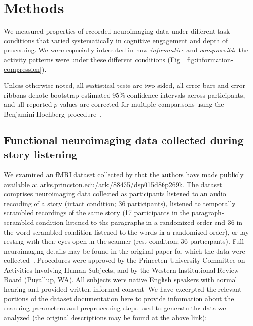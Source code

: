 \documentclass[english, 11pt]{article}
\begin{document}
\section*{Methods}

We measured properties of recorded neuroimaging data under different task
conditions that varied systematically in cognitive engagement and depth of
processing. We were especially interested in how \textit{informative} and
\textit{compressible} the activity patterns were under these different
conditions (Fig.~\ref{fig:information-compression}).

Unless otherwise noted, all statistical tests are two-sided, all error bars and
error ribbons denote bootstrap-estimated 95\% confidence intervals across
participants, and all reported $p$-values are corrected for multiple
comparisons using the Benjamini-Hochberg procedure~\citep{BenjHoch95}.

\subsection*{Functional neuroimaging data collected during story
  listening}

We examined an fMRI dataset collected by \cite{SimoEtal16} that the authors
have made publicly available at
\href{http://arks.princeton.edu/ark:/88435/dsp015d86p269k}{arks.princeton.edu/ark:/88435/dsp015d86p269k}.
The dataset comprises neuroimaging data collected as participants listened to
an audio recording of a story (intact condition; 36 participants), listened to
temporally scrambled recordings of the same story (17 participants in the
paragraph-scrambled condition listened to the paragraphs in a randomized order
and 36 in the word-scrambled condition listened to the words in a randomized
order), or lay resting with their eyes open in the scanner (rest condition; 36
participants). Full neuroimaging details may be found in the original paper for
which the data were collected~\citep{SimoEtal16}. Procedures were approved by
the Princeton University Committee on Activities Involving Human Subjects, and
by the Western Institutional Review Board (Puyallup, WA). All subjects were
native English speakers with normal hearing and provided written informed
consent. We have excerpted the relevant portions of the dataset documentation
here to provide information about the scanning parameters and preprocessing
steps used to generate the data we analyzed (the original descriptions may be
found at the above link):
\end{document}
